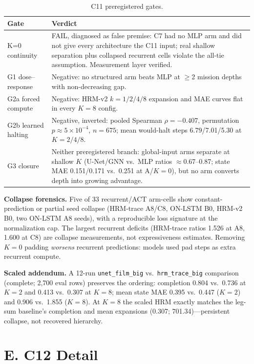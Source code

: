 \documentclass[letterpaper]{article} %
\newcommand{\stage}[1]{\textsc{#1}}
\begin{document}
\begin{table}[h]
\centering
\footnotesize
\begin{tabular}{@{}lp{5.2cm}@{}}
\toprule
Gate & Verdict \\
\midrule
K=0 continuity & FAIL, diagnosed as false premise: \stage{C7} had no MLP arm and did not give every architecture the \stage{C11} input; real shallow separation plus collapsed recurrent cells violate the all-tie assumption. Measurement layer verified. \\
G1 dose--response & Negative: no structured arm beats MLP at $\geq$2 mission depths with non-decreasing gap. \\
G2a forced compute & Negative: HRM-v2 $k{=}1/2/4/8$ expansion and MAE curves flat in every $K{=}8$ config. \\
G2b learned halting & Negative, inverted: pooled Spearman $\rho{=}-0.407$, permutation $p{\approx}5{\times}10^{-4}$, $n{=}675$; mean would-halt steps 6.79/7.01/5.30 at $K{=}2/4/8$. \\
G3 closure & Neither preregistered branch: global-input arms separate at shallow $K$ (U-Net/GNN vs.\ MLP ratios $\approx$0.67--0.87; state MAE 0.151/0.171 vs.\ 0.251 at A/$K{=}0$), but no arm converts depth into growing advantage. \\
\bottomrule
\end{tabular}
\caption{\stage{C11} preregistered gates.}
\label{tab:c11gates}
\end{table}

\textbf{Collapse forensics.} Five of 33 recurrent/ACT arm-cells show constant-prediction or partial seed collapse (HRM-trace A8/C8, ON-LSTM B0, HRM-v2 B0, two ON-LSTM A8 seeds), with a reproducible loss signature at the normalization cap. The largest recurrent deficits (HRM-trace ratios 1.526 at A8, 1.600 at C8) are collapse measurements, not expressiveness estimates. Removing $K{=}0$ padding \emph{worsens} recurrent predictions: models used pad steps as extra recurrent compute.

\textbf{Scaled addendum.} A 12-run \texttt{unet\_film\_big} vs.\ \texttt{hrm\_trace\_big} comparison (complete; 2{,}700 eval rows) preserves the ordering: completion 0.804 vs.\ 0.736 at $K{=}2$ and 0.413 vs.\ 0.307 at $K{=}8$; mean state MAE 0.395 vs.\ 0.447 ($K{=}2$) and 0.906 vs.\ 1.855 ($K{=}8$). At $K{=}8$ the scaled HRM exactly matches the leg-sum baseline's completion and mean expansions (0.307; 701.34)---persistent collapse, not recovered hierarchy.

\section{E. \stage{C12} Detail}
\end{document}

